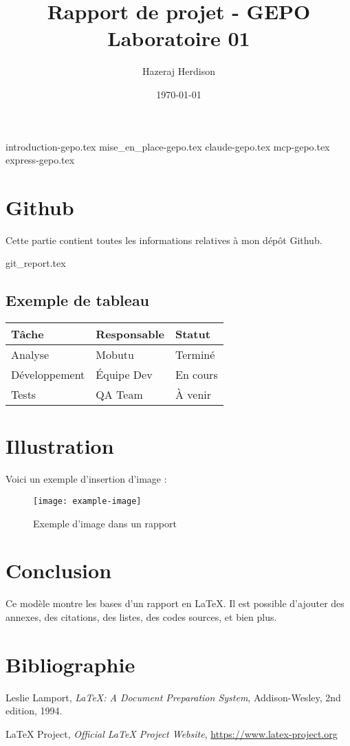 \documentclass[12pt]{report}
\title{Rapport de projet - GEPO \\ \large Laboratoire 01}
\author{Hazeraj Herdison}
\date{\today}
\begin{document}
\maketitle
\tableofcontents
\newpage

{introduction-gepo.tex}
{mise_en_place-gepo.tex}
{claude-gepo.tex}
{mcp-gepo.tex}
{express-gepo.tex}

\section{Github}
Cette partie contient toutes les informations relatives à mon dépôt Github. 

{git_report.tex}

\subsection*{Exemple de tableau}
\begin{center}
\begin{tabular}{lll}
\toprule
\textbf{Tâche} & \textbf{Responsable} & \textbf{Statut} \\
\midrule
Analyse        & Mobutu     & Terminé \\
Développement  & Équipe Dev & En cours \\
Tests          & QA Team    & À venir \\
\bottomrule
\end{tabular}
\end{center}

\section{Illustration}
Voici un exemple d'insertion d'image :

\begin{figure}[h!]
\centering
\texttt{[image: example-image]}
\caption{Exemple d'image dans un rapport}
\end{figure}

\section{Conclusion}
Ce modèle montre les bases d’un rapport en LaTeX. Il est possible d’ajouter des annexes, des citations, des listes, des codes sources, et bien plus.

\newpage
\section*{Bibliographie}
\begin{thebibliography}{9}
Leslie Lamport,
\textit{LaTeX: A Document Preparation System},
Addison-Wesley, 2nd edition, 1994.

LaTeX Project,
\textit{Official LaTeX Project Website},
\url{https://www.latex-project.org}
\end{thebibliography}
\end{document}
